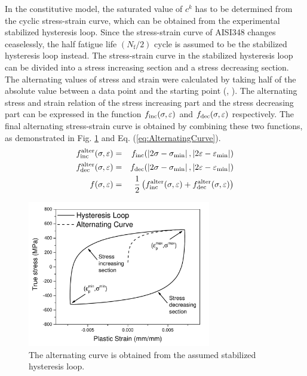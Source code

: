 \documentclass[final,5p,times,onecolumn,10pt,sort&compress]{elsarticle}
\begin{document}
In the constitutive model, the saturated value of $c^{k}$ has to be determined from the cyclic stress-strain curve, which can be obtained from the experimental stabilized hysteresis loop. Since the stress-strain curve of AISI348 changes ceaselessly, the half fatigue life $\left (N_{\mathrm{f}} / 2\right)$ cycle is assumed to be the stabilized hysteresis loop instead. The stress-strain curve in the stabilized hysteresis loop can be divided into a stress increasing section and a stress decreasing section. The alternating values of stress and strain were calculated by taking half of the absolute value between a data point and the starting point (\citeauthor{SunCyclic}, \citeyear{SunCyclic}). The alternating stress and strain relation of the stress increasing part and the stress decreasing part can be expressed in the function $f_{\rm  inc } (\sigma, \varepsilon)$ and $f_{\rm { dec }} (\sigma, \varepsilon)$ respectively. The final alternating stress-strain curve is obtained by combining these two functions, as demonstrated in Fig. \ref{fig:Alternating Curve} and Eq. (\ref{eq:AlternatingCurve}).
\begin{eqnarray}\label{eq:AlternatingCurve}
f_{\rm { inc }}^{\rm {alter}} (\sigma, \varepsilon)&=&f_{\rm { inc }} (\left|2 \sigma-\sigma_{\min }\right|, \left|2 \varepsilon-\varepsilon_{\min }\right|)\\
f_{\rm { dec }}^{\rm {alter}}(\sigma, \varepsilon)&=&f_{\rm { dec }}(\left|2 \sigma-\sigma_{\min }\right|, \left|2 \varepsilon-\varepsilon_{\min }\right|)\\
f(\sigma, \varepsilon)&=&\frac{1}{2}\left(f_{\rm { inc }}^{\rm {alter}}(\sigma, \varepsilon)+f_{\rm { dec }}^{\rm {alter}}(\sigma, \varepsilon)\right)
\end{eqnarray}
\begin{figure}[htbp]
  \begin{center}
  \includegraphics[width=8cm]{AlternatingCurve.pdf}
  \caption{The alternating curve is obtained from the assumed stabilized hysteresis loop.}
  \label{fig:Alternating Curve}
  \end{center}
\end{figure}
\end{document}
